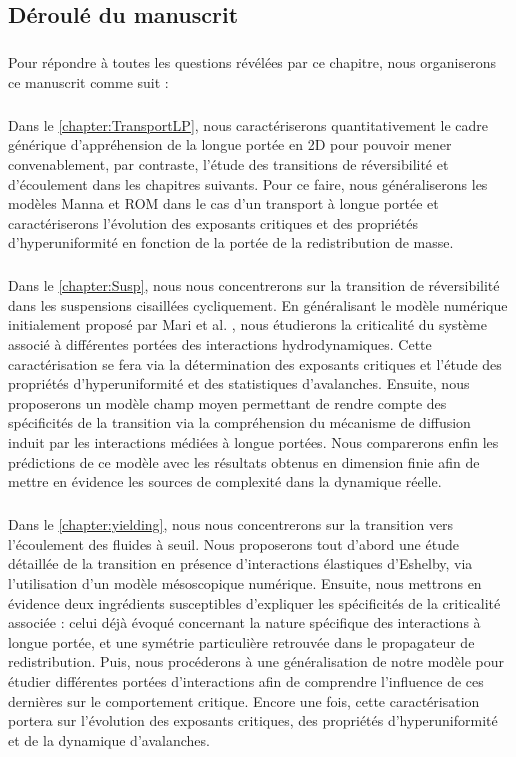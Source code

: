 \subsection{Déroulé du manuscrit}

\subparagraph{}Pour répondre à toutes les questions révélées par ce chapitre, nous organiserons ce manuscrit comme suit :

\subparagraph{}Dans le \autoref{chapter:TransportLP}, nous caractériserons quantitativement le cadre générique d'appréhension de la longue portée en 2D pour pouvoir mener convenablement, par contraste, l'étude des transitions de réversibilité et d'écoulement dans les chapitres suivants. Pour ce faire, nous généraliserons les modèles Manna et ROM dans le cas d'un transport à longue portée et caractériserons l'évolution des exposants critiques et des propriétés d'hyperuniformité en fonction de la portée de la redistribution de masse. 

\subparagraph{}Dans le \autoref{chapter:Susp}, nous nous concentrerons sur la transition de réversibilité dans les suspensions cisaillées cycliquement. En généralisant le modèle numérique initialement proposé par Mari et al. \cite{mari_absorbing_2022}, nous étudierons la criticalité du système associé à différentes portées des interactions hydrodynamiques. Cette caractérisation se fera via la détermination des exposants critiques et l'étude des propriétés d'hyperuniformité et des statistiques d'avalanches. Ensuite, nous proposerons un modèle champ moyen permettant de rendre compte des spécificités de la transition via la compréhension du mécanisme de diffusion induit par les interactions médiées à longue portées. Nous comparerons enfin les prédictions de ce modèle avec les résultats obtenus en dimension finie afin de mettre en évidence les sources de complexité dans la dynamique réelle.

\subparagraph{}Dans le \autoref{chapter:yielding}, nous nous concentrerons sur la transition vers l'écoulement des fluides à seuil. Nous proposerons tout d'abord une étude détaillée de la transition en présence d'interactions élastiques d'Eshelby, via l'utilisation d'un modèle mésoscopique numérique. Ensuite, nous mettrons en évidence deux ingrédients susceptibles d'expliquer les spécificités de la criticalité associée : celui déjà évoqué concernant la nature spécifique des interactions à longue portée, et une symétrie particulière retrouvée dans le propagateur de redistribution. Puis, nous procéderons à une généralisation de notre modèle pour étudier différentes portées d'interactions afin de comprendre l'influence de ces dernières sur le comportement critique. Encore une fois, cette caractérisation portera sur l'évolution des exposants critiques, des propriétés d'hyperuniformité et de la dynamique d'avalanches.

